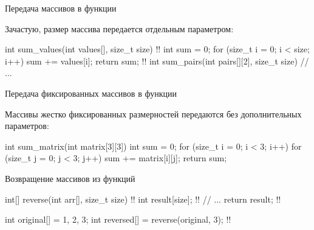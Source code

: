 \begin{frame}[fragile]{Передача массивов в функции}

  Зачастую, размер массива передается отдельным параметром:
  \begin{clisting}[escapechar=\!]
    int sum_values(int values[], size_t size) !\pause!{
        int sum = 0;
        for (size_t i = 0; i < size; i++) {
            sum += values[i];
        }
        return sum;
    }
    !\pause!
    int sum_pairs(int pairs[][2], size_t size) {
        // ...
    }
  \end{clisting}



\end{frame}

\begin{frame}[fragile]{Передача фиксированных массивов в функции}

  Массивы жестко фиксированных размерностей передаются без дополнительных
  параметров:
  \begin{clisting}
    int sum_matrix(int matrix[3][3]) {
        int sum = 0;
        for (size_t i = 0; i < 3; i++) {
            for (size_t j = 0; j < 3; j++) {
                sum += matrix[i][j];
            }
        }
        return sum;
    }
  \end{clisting}

\end{frame}

\begin{frame}[fragile]{Возвращение массивов из функций}

  \onslide<+->
  \begin{clisting}[escapechar=\!]
    int[] reverse(int arr[], size_t size) {
      !!
        int result[size]; !!
        // ...
        return result; !!
    }

    int original[] = {1, 2, 3};
    int reversed[] = reverse(original, 3);
      !!
  \end{clisting}

\end{frame}

